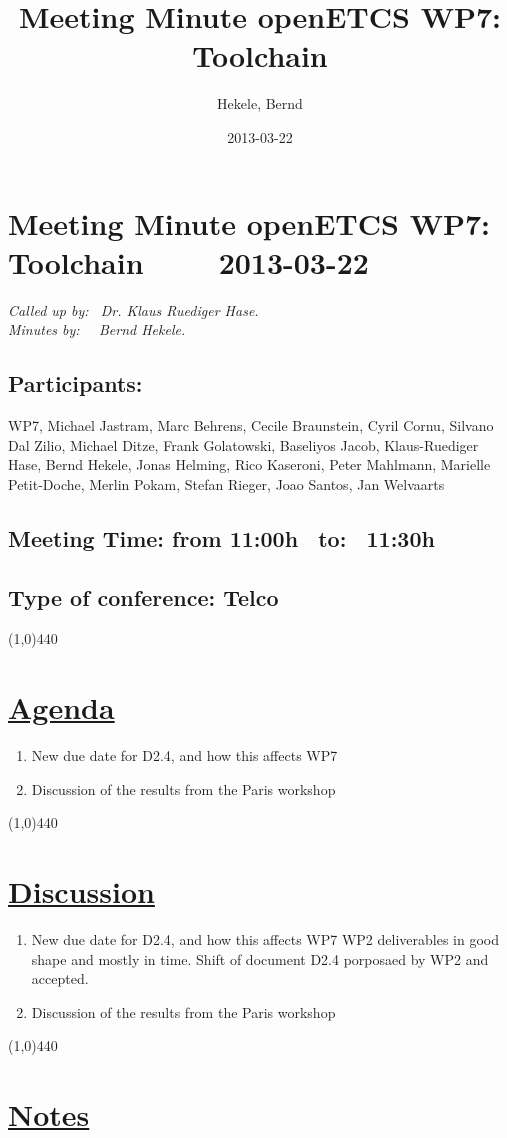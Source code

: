 \documentclass[a4paper]{article}
\title{Meeting Minute openETCS WP7: Toolchain}
\author{Hekele, Bernd}
\date{2013-03-22}
\begin{document}
\section*{\large{Meeting Minute openETCS WP7: Toolchain \ \ \ \ 2013-03-22}}

\emph{Called up by: \ Dr. Klaus Ruediger Hase.}\\
\emph{Minutes by: \ \  Bernd Hekele.}

\subsection*{Participants:} WP7, 
Michael Jastram, 
Marc Behrens, 
Cecile Braunstein,
Cyril Cornu,
Silvano Dal Zilio,
Michael Ditze, 
Frank Golatowski, 
Baseliyos Jacob,
Klaus-Ruediger Hase, 
Bernd Hekele,
Jonas Helming,
Rico Kaseroni, 
Peter Mahlmann, 
Marielle Petit-Doche, 
Merlin Pokam,
Stefan Rieger, 
Joao Santos,
Jan Welvaarts\\


\subsection*{Meeting Time: from 11:00h \ to: \ 11:30h}

\subsection*{Type of conference: Telco}

\line(1,0){440}
\section*{\underline{Agenda}}
\begin{enumerate}
\item New due date for D2.4, and how this affects WP7
\item Discussion of the results from the Paris workshop
\end{enumerate}
\line(1,0){440}
\section*{\underline{Discussion}}

\begin{enumerate}

\item New due date for D2.4, and how this affects WP7
WP2 deliverables in good shape and mostly in time. Shift of document D2.4 porposaed by WP2 and accepted.\\
\item Discussion of the results from the Paris workshop\\

\end{enumerate}

\line(1,0){440}
\section*{\underline{Notes}}
\end{document}
